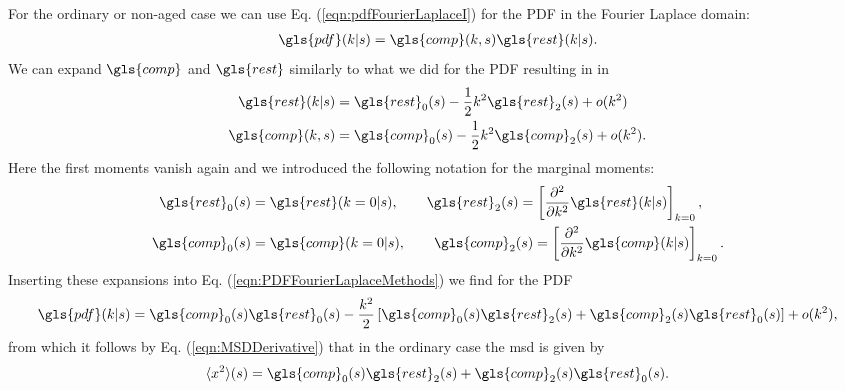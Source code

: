 For the ordinary or non-aged case we can use Eq. (\ref{eqn:pdfFourierLaplaceI}) for the \gls{PDF} in the Fourier Laplace domain:
%
\begin{align}
\gls{pdf}(k|s) = \gls{comp}(k,s) \gls{rest}(k|s) \label{eqn:PDFFourierLaplaceMethods} .
\end{align}
%
We can expand $\gls{comp}$ and $\gls{rest}$ similarly to what we did for the \gls{PDF} resulting in in 
%
\begin{align}
\gls{rest}(k|s) &= \gls{rest}_0(s) - \frac{1}{2} k^2 \gls{rest}_2(s) + o(k^2) \label{eqn:rExpansion}\\
\gls{comp}(k,s) &= \gls{comp}_0(s)- \frac{1}{2} k^2 \gls{comp}_2(s) + o(k^2) .
\end{align}
%
Here the first moments vanish again and we introduced the following notation for the marginal moments:
%
\begin{align}
\gls{rest}_0(s) &=   \gls{rest}(k=0|s), \qquad \gls{rest}_2 (s) =   \left[ \npder{}{k}{2} \gls{rest}(k|s) \right]_{k=0}, \\
\gls{comp}_0(s) &=   \gls{comp}(k=0|s), \qquad \gls{comp}_2 (s) =   \left[ \npder{}{k}{2} \gls{comp}(k|s) \right]_{k=0}.
\end{align}
%
Inserting these expansions into Eq. (\ref{eqn:PDFFourierLaplaceMethods}) we find for the \gls{PDF}
%
\begin{align}
\gls{pdf}(k|s)  = \gls{comp}_0(s)\gls{rest}_0(s) - \frac{k^2}{2}\left[\gls{comp}_0(s) \gls{rest}_2(s)+\gls{comp}_2(s)\gls{rest}_0(s)\right] +o(k^2) ,
\end{align}
%
from which it follows by Eq. (\ref{eqn:MSDDerivative}) that in the ordinary case the \gls{msd} is given by 
%
\begin{align}
\mean{x^2}(s) = \gls{comp}_0(s) \gls{rest}_2(s)+\gls{comp}_2(s)\gls{rest}_0(s) \label{eqn:x2Ordinary}. 
\end{align}

